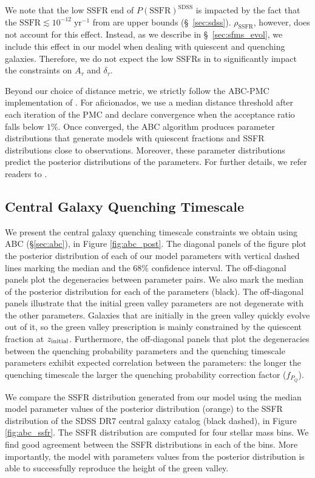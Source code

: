 We note that the low SSFR end of $P(\mathrm{SSFR})^\mathrm{SDSS}$ 
is impacted by the fact that the 
$\mathrm{SSFR} \lesssim 10^{-12}\;\mathrm{yr}^{-1}$ from 
\cite{Brinchmann:2004aa} are upper bounds (\S~\ref{sec:sdss}). 
$\rho_\mathrm{SSFR}$, however, does not account for this effect. 
Instead, as we describe in \S~\ref{sec:sfms_evol}, 
we include this effect in our model when dealing with 
quiescent and quenching galaxies. Therefore, we do not expect
the low SSFRs in \cite{Brinchmann:2004aa} to significantly impact
the constraints on $A_\tau$ and $\delta_\tau$. 

Beyond our choice of distance metric, we strictly follow the ABC-PMC 
implementation of \cite{Hahn:2016aa}. For aficionados, we use a median 
distance threshold after each iteration of the PMC and declare 
convergence when the acceptance ratio falls below $1\%$. Once converged, 
the ABC algorithm produces parameter distributions that generate models 
with quiescent fractions and SSFR distributions close to observations. 
Moreover, these parameter distributions predict the posterior distributions 
of the parameters. For further details, we refer readers to \cite{Hahn:2016aa}.

\subsection{Central Galaxy Quenching Timescale} \label{sec:results}
We present the central galaxy quenching timescale constraints 
we obtain using ABC (\S \ref{sec:abc}), in Figure 
\ref{fig:abc_post}. The diagonal panels of the figure plot 
the posterior distribution of each of our model parameters 
with vertical dashed lines marking the median and the $68\%$ 
confidence interval. The off-diagonal panels plot the 
degeneracies between parameter pairs. We also mark the median 
of the posterior distribution for each of the parameters (black). 
The off-diagonal panels illustrate that the initial green valley 
parameters are not degenerate with the other parameters. 
Galaxies that are initially in the green valley quickly 
evolve out of it, so the green valley prescription is mainly 
constrained by the quiescent fraction at $z_\mathrm{initial}$. Furthermore, 
the off-diagonal panels that plot the degeneracies between 
the quenching probability parameters and the quenching timescale 
parameters exhibit expected correlation between the parameters: 
the longer the quenching timescale the larger the quenching 
probability correction factor ($f_{P_Q}$). 

We compare the SSFR distribution generated from our model 
using the median model parameter values of the posterior 
distribution (orange) to the SSFR distribution of the SDSS 
DR7 central galaxy catalog (black dashed), in Figure 
\ref{fig:abc_ssfr}. The SSFR distribution are computed for 
four stellar mass bins. We find good agreement between the 
SSFR distributions in each of the bins. More importantly, 
the model with parameters values from the posterior distribution 
is able to successfully reproduce the height of the green valley.

